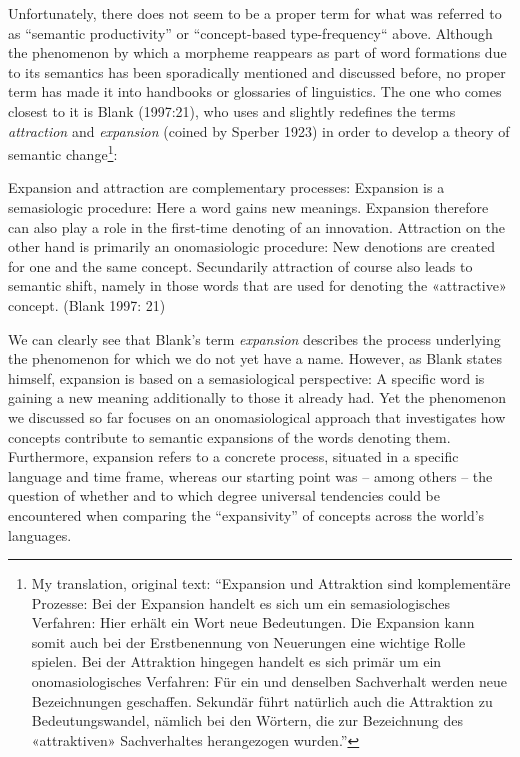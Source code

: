 \documentclass[
  a4paper,
  14pt,
  oneside,
  tablecaptionabove
]{scrbook}
\renewenvironment{quote}{\begin{customblockquote}\list{}{\rightmargin=0em\leftmargin=0em}%
\item\relax\color{blockquote-text}\ignorespaces}{\unskip\unskip\endlist\end{customblockquote}}
\begin{document}
Unfortunately, there does not seem to be a proper term for what was
referred to as \enquote{semantic productivity} or ``concept-based
type-frequency`` above. Although the phenomenon by which a morpheme
reappears as part of word formations due to its semantics has been
sporadically mentioned and discussed before, no proper term has made it
into handbooks or glossaries of linguistics. The one who comes closest
to it is Blank (1997:21), who uses and slightly redefines the terms
\emph{attraction} and \emph{expansion} (coined by Sperber 1923) in order
to develop a theory of semantic change\footnote{My translation, original text: \enquote{Expansion und Attraktion
sind komplementäre Prozesse: Bei der Expansion handelt es sich um ein
semasiologisches Verfahren: Hier erhält ein Wort neue Bedeutungen. Die
Expansion kann somit auch bei der Erstbenennung von Neuerungen eine
wichtige Rolle spielen. Bei der Attraktion hingegen handelt es sich
primär um ein onomasiologisches Verfahren: Für ein und denselben
Sachverhalt werden neue Bezeichnungen geschaffen. Sekundär führt
natürlich auch die Attraktion zu Bedeutungswandel, nämlich bei den
Wörtern, die zur Bezeichnung des «attraktiven» Sachverhaltes
herangezogen wurden.}}:

\begin{quote}
Expansion and attraction are complementary processes: Expansion is a
semasiologic procedure: Here a word gains new meanings. Expansion
therefore can also play a role in the first-time denoting of an
innovation. Attraction on the other hand is primarily an onomasiologic
procedure: New denotions are created for one and the same concept.
Secundarily attraction of course also leads to semantic shift, namely in
those words that are used for denoting the «attractive» concept. (Blank
1997: 21)
\end{quote}

We can clearly see that Blank's term \emph{expansion} describes the
process underlying the phenomenon for which we do not yet have a name.
However, as Blank states himself, expansion is based on a semasiological
perspective: A specific word is gaining a new meaning additionally to
those it already had. Yet the phenomenon we discussed so far focuses on
an onomasiological approach that investigates how concepts contribute to
semantic expansions of the words denoting them. Furthermore, expansion
refers to a concrete process, situated in a specific language and time
frame, whereas our starting point was -- among others -- the question of
whether and to which degree universal tendencies could be encountered
when comparing the \enquote{expansivity} of concepts across the world's
languages.
\end{document}
